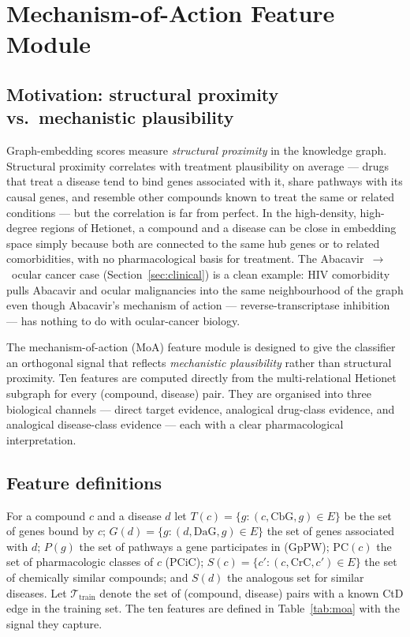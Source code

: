\documentclass[twocolumn,10pt]{article}
\begin{document}
\section{Mechanism-of-Action Feature Module}
\label{sec:moa}

\subsection{Motivation: structural proximity vs.\ mechanistic plausibility}

Graph-embedding scores measure \emph{structural proximity} in the knowledge graph. Structural proximity correlates with treatment plausibility on average --- drugs that treat a disease tend to bind genes associated with it, share pathways with its causal genes, and resemble other compounds known to treat the same or related conditions --- but the correlation is far from perfect. In the high-density, high-degree regions of Hetionet, a compound and a disease can be close in embedding space simply because both are connected to the same hub genes or to related comorbidities, with no pharmacological basis for treatment. The Abacavir~$\to$~ocular cancer case (Section~\ref{sec:clinical}) is a clean example: HIV comorbidity pulls Abacavir and ocular malignancies into the same neighbourhood of the graph even though Abacavir's mechanism of action --- reverse-transcriptase inhibition --- has nothing to do with ocular-cancer biology.

The mechanism-of-action (MoA) feature module is designed to give the classifier an orthogonal signal that reflects \emph{mechanistic plausibility} rather than structural proximity. Ten features are computed directly from the multi-relational Hetionet subgraph for every (compound, disease) pair. They are organised into three biological channels --- direct target evidence, analogical drug-class evidence, and analogical disease-class evidence --- each with a clear pharmacological interpretation.

\subsection{Feature definitions}

For a compound $c$ and a disease $d$ let $T(c) = \{g : (c, \mathrm{CbG}, g) \in E\}$ be the set of genes bound by $c$; $G(d) = \{g : (d, \mathrm{DaG}, g) \in E\}$ the set of genes associated with $d$; $P(g)$ the set of pathways a gene participates in (GpPW); $\mathrm{PC}(c)$ the set of pharmacologic classes of $c$ (PCiC); $S(c) = \{c' : (c, \mathrm{CrC}, c') \in E\}$ the set of chemically similar compounds; and $S(d)$ the analogous set for similar diseases. Let $\mathcal{T}_{\mathrm{train}}$ denote the set of (compound, disease) pairs with a known CtD edge in the training set. The ten features are defined in Table~\ref{tab:moa} with the signal they capture.
\end{document}
